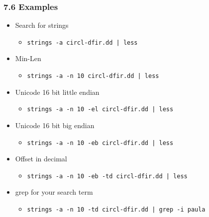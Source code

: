 \begin{frame}[fragile]
  \frametitle{7.6 Examples}
    \begin{itemize}
       \item Search for strings
            \begin{itemize}
		    \item \texttt{strings -a circl-dfir.dd | less}
            \end{itemize}
       \item Min-Len
            \begin{itemize}
		    \item \texttt{strings -a -n 10 circl-dfir.dd | less}
            \end{itemize}
       \item Unicode 16 bit little endian
            \begin{itemize}
		    \item \texttt{strings -a -n 10 -el circl-dfir.dd | less}
            \end{itemize}
       \item Unicode 16 bit big endian
            \begin{itemize}
		    \item \texttt{strings -a -n 10 -eb circl-dfir.dd | less}
            \end{itemize}
       \item Offset in decimal
            \begin{itemize}
		    \item \texttt{strings -a -n 10 -eb -td circl-dfir.dd | less}
            \end{itemize}
       \item grep for your search term
            \begin{itemize}
		    \item \texttt{strings -a -n 10 -td circl-dfir.dd | grep -i paula}
            \end{itemize}
    \end{itemize}
\end{frame}


